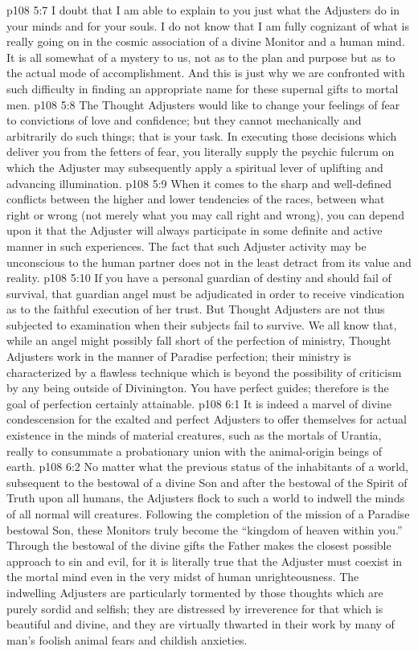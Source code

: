 \vs p108 5:7 I doubt that I am able to explain to you just what the Adjusters do in your minds and for your souls. I do not know that I am fully cognizant of what is really going on in the cosmic association of a divine Monitor and a human mind. It is all somewhat of a mystery to us, not as to the plan and purpose but as to the actual mode of accomplishment. And this is just why we are confronted with such difficulty in finding an appropriate name for these supernal gifts to mortal men.
\vs p108 5:8 The Thought Adjusters would like to change your feelings of fear to convictions of love and confidence; but they cannot mechanically and arbitrarily do such things; that is your task. In executing those decisions which deliver you from the fetters of fear, you literally supply the psychic fulcrum on which the Adjuster may subsequently apply a spiritual lever of uplifting and advancing illumination.
\vs p108 5:9 When it comes to the sharp and well\hyp{}defined conflicts between the higher and lower tendencies of the races, between what  right or wrong (not merely what you may call right and wrong), you can depend upon it that the Adjuster will always participate in some definite and active manner in such experiences. The fact that such Adjuster activity may be unconscious to the human partner does not in the least detract from its value and reality.
\vs p108 5:10 If you have a personal guardian of destiny and should fail of survival, that guardian angel must be adjudicated in order to receive vindication as to the faithful execution of her trust. But Thought Adjusters are not thus subjected to examination when their subjects fail to survive. We all know that, while an angel might possibly fall short of the perfection of ministry, Thought Adjusters work in the manner of Paradise perfection; their ministry is characterized by a flawless technique which is beyond the possibility of criticism by any being outside of Divinington. You have perfect guides; therefore is the goal of perfection certainly attainable.
\vs p108 6:1 It is indeed a marvel of divine condescension for the exalted and perfect Adjusters to offer themselves for actual existence in the minds of material creatures, such as the mortals of Urantia, really to consummate a probationary union with the animal\hyp{}origin beings of earth.
\vs p108 6:2 No matter what the previous status of the inhabitants of a world, subsequent to the bestowal of a divine Son and after the bestowal of the Spirit of Truth upon all humans, the Adjusters flock to such a world to indwell the minds of all normal will creatures. Following the completion of the mission of a Paradise bestowal Son, these Monitors truly become the “kingdom of heaven within you.” Through the bestowal of the divine gifts the Father makes the closest possible approach to sin and evil, for it is literally true that the Adjuster must coexist in the mortal mind even in the very midst of human unrighteousness. The indwelling Adjusters are particularly tormented by those thoughts which are purely sordid and selfish; they are distressed by irreverence for that which is beautiful and divine, and they are virtually thwarted in their work by many of man’s foolish animal fears and childish anxieties.
